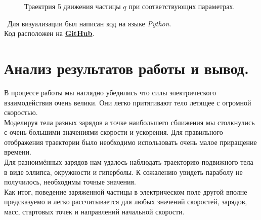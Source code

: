 \documentclass[a5paper, 10pt]{article}
\theoremstyle{definition}
\theoremstyle{plain}
\theoremstyle{remark}
\begin{document}
\begin{figure}[h!]
\caption{Траектрия 5 движения частицы $q$ при соответствующих параметрах.}
\end{figure}



\newpage

\newpage
\,
\newpage
Для визуализации был написан код на языке \textit{Python}. \\
Код расположен на \href{https://github.com/a-nechaeva/phys_project_2/blob/main/python_code}{\textbf{GitHub}}.

\section{Анализ результатов работы и вывод.}
В процессе работы мы наглядно убедились что силы электрического взаимодействия очень велики. Они легко притягивают тело летящее с огромной скоростью.\\
Моделируя тела разных зарядов а точке наибольшего сближения мы столкнулись с очень большими значениями скорости и ускорения. Для правильного отображения траектории было необходимо использовать очень малое приращение времени.\\
Для разноимённых зарядов нам удалось наблюдать траекторию подвижного тела в виде эллипса, окружности и гиперболы. К сожалению увидеть параболу не получилось, необходимы точные значения.\\
Как итог, поведение заряженной частицы в электрическом поле другой вполне предсказуемо и легко рассчитывается для любых значений скоростей, зарядов, масс, стартовых точек и направлений начальной скорости.
\end{document}
